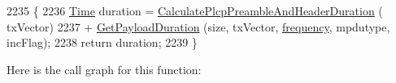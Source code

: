 \begin{DoxyCode}
2235 \{
2236   \hyperlink{namespacens3_1_1TracedValueCallback_a7ffd3e7c142ffe7c8a1d2db9b8de38ec}{Time} duration = \hyperlink{classns3_1_1WifiPhy_ac308f6020523524aaf1feb20565ce339}{CalculatePlcpPreambleAndHeaderDuration} (
      txVector)
2237     + \hyperlink{classns3_1_1WifiPhy_a905bac41f7337da26788a2bbb971d3fa}{GetPayloadDuration} (size, txVector, \hyperlink{lte_2model_2fading-traces_2fading__trace__generator_8m_a09045328d6d7e16aa4013f526cc6993d}{frequency}, mpdutype, incFlag);
2238   \textcolor{keywordflow}{return} duration;
2239 \}
\end{DoxyCode}


Here is the call graph for this function\+:


